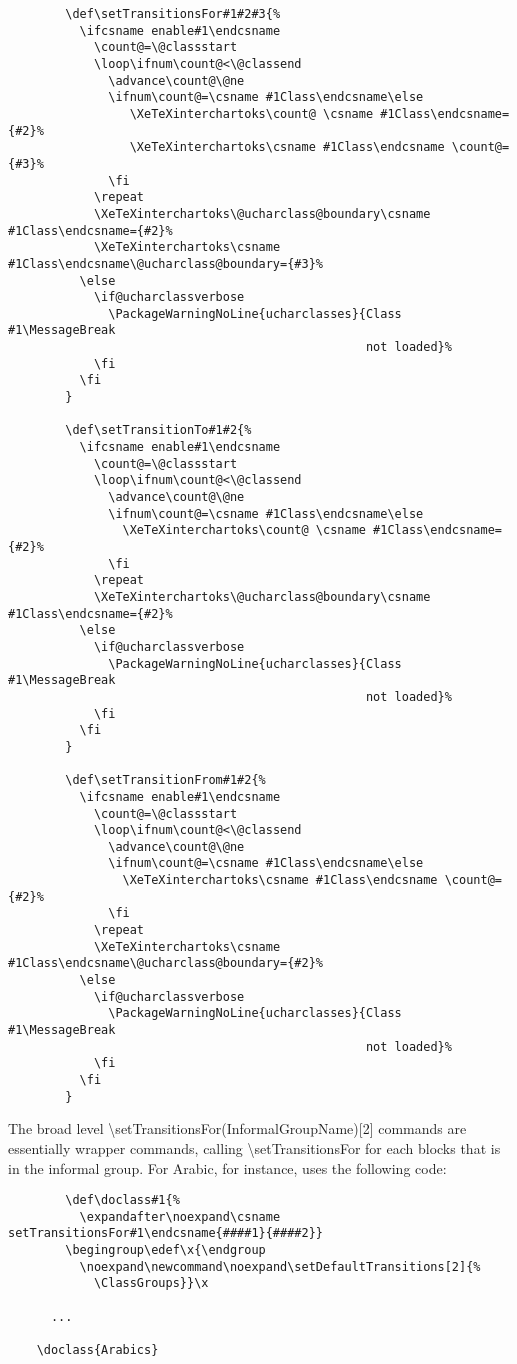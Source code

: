 \documentclass{article}
\begin{document}
		\disableTransitionRules
		\begin{verbatim}
		\def\setTransitionsFor#1#2#3{%
		  \ifcsname enable#1\endcsname
		    \count@=\@classstart
		    \loop\ifnum\count@<\@classend
		      \advance\count@\@ne
		      \ifnum\count@=\csname #1Class\endcsname\else
		         \XeTeXinterchartoks\count@ \csname #1Class\endcsname={#2}%
		         \XeTeXinterchartoks\csname #1Class\endcsname \count@={#3}%
		      \fi
		    \repeat
		    \XeTeXinterchartoks\@ucharclass@boundary\csname #1Class\endcsname={#2}%
		    \XeTeXinterchartoks\csname #1Class\endcsname\@ucharclass@boundary={#3}%
		  \else
		    \if@ucharclassverbose
		      \PackageWarningNoLine{ucharclasses}{Class #1\MessageBreak
		                                          not loaded}%
		    \fi
		  \fi
		}

		\def\setTransitionTo#1#2{%
		  \ifcsname enable#1\endcsname
		    \count@=\@classstart
		    \loop\ifnum\count@<\@classend
		      \advance\count@\@ne
		      \ifnum\count@=\csname #1Class\endcsname\else
		        \XeTeXinterchartoks\count@ \csname #1Class\endcsname={#2}%
		      \fi
		    \repeat
		    \XeTeXinterchartoks\@ucharclass@boundary\csname #1Class\endcsname={#2}%
		  \else
		    \if@ucharclassverbose
		      \PackageWarningNoLine{ucharclasses}{Class #1\MessageBreak
		                                          not loaded}%
		    \fi
		  \fi
		}

		\def\setTransitionFrom#1#2{%
		  \ifcsname enable#1\endcsname
		    \count@=\@classstart
		    \loop\ifnum\count@<\@classend
		      \advance\count@\@ne
		      \ifnum\count@=\csname #1Class\endcsname\else
		        \XeTeXinterchartoks\csname #1Class\endcsname \count@={#2}%
		      \fi
		    \repeat
		    \XeTeXinterchartoks\csname #1Class\endcsname\@ucharclass@boundary={#2}%
		  \else
		    \if@ucharclassverbose
		      \PackageWarningNoLine{ucharclasses}{Class #1\MessageBreak
		                                          not loaded}%
		    \fi
		  \fi
		}
		\end{verbatim}
		\enableTransitionRules

		The broad level \textbackslash setTransitionsFor(InformalGroupName)[2] commands are essentially wrapper commands, calling \textbackslash setTransitionsFor for each blocks that is in the informal group. For Arabic, for instance, uses the following code:

		\disableTransitionRules
		\begin{verbatim}
		\def\doclass#1{%
		  \expandafter\noexpand\csname setTransitionsFor#1\endcsname{####1}{####2}}
		\begingroup\edef\x{\endgroup
		  \noexpand\newcommand\noexpand\setDefaultTransitions[2]{%
		    \ClassGroups}}\x

	  ...

    \doclass{Arabics}
		\end{verbatim}
		\enableTransitionRules
\end{document}
